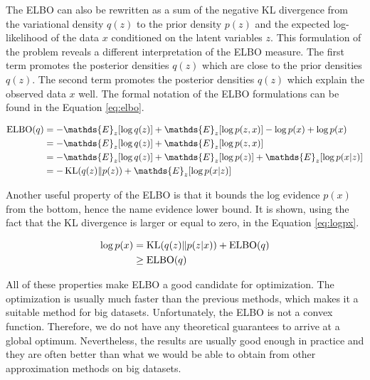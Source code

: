 The ELBO can also be rewritten as a sum of the negative KL divergence from the variational density $q(z)$ to the prior density $p(z)$ and the expected log-likelihood of the data $x$ conditioned on the latent variables $z$.
This formulation of the problem reveals a different interpretation of the ELBO measure.
The first term promotes the posterior densities $q(z)$ which are close to the prior densities $q(z)$.
The second term promotes the posterior densities $q(z)$ which explain the observed data $x$ well.
The formal notation of the ELBO formulations can be found in the Equation \ref{eq:elbo}.

\begin{equation}
\begin{split}
    \ELBO(q) &= - \mathds{E}_{z}[\log q(z)] + \mathds{E}_{z}[\log p(z,x)] - \log p(x) + \log p(x) \\
             &= - \mathds{E}_{z}[\log q(z)] + \mathds{E}_{z}[\log p(z,x)] \\
             &= - \mathds{E}_{z}[\log q(z)] + \mathds{E}_{z}[\log p(z)] + \mathds{E}_{z}[\log p(x|z)]   \\
             &= - \KL(q(z) \| p(z)) + \mathds{E}_{z}[\log p(x|z)] \\
\end{split}
\label{eq:elbo}
\end{equation}

Another useful property of the ELBO is that it bounds the log evidence $p(x)$ from the bottom, hence the name evidence lower bound.
It is shown, using the fact that the KL divergence is larger or equal to zero, in the Equation \ref{eq:logpx}.

\begin{equation}
\begin{split}
    \log p(x) &= \operatorname{KL}(q(z) \| p(z|x)) + \operatorname{ELBO}(q) \\
              &\geq \operatorname{ELBO}(q)
\end{split}
\label{eq:logpx}
\end{equation}

All of these properties make ELBO a good candidate for optimization.
The optimization is usually much faster than the previous methods, which makes it a suitable method for big datasets.
Unfortunately, the ELBO is not a convex function.
Therefore, we do not have any theoretical guarantees to arrive at a global optimum.
Nevertheless, the results are usually good enough in practice and they are often better than what we would be able to obtain from other approximation methods on big datasets.

